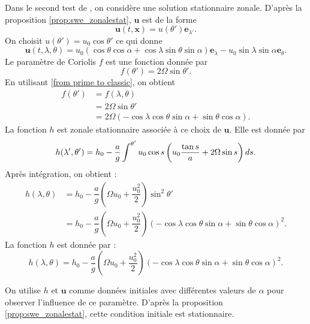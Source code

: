 Dans le second test de \cite{Williamson1992}, on considère une solution stationnaire zonale. D'après la proposition \ref{prop:swe_zonalestat}, $\mathbf{u}$ est de la forme
\begin{equation}
\mathbf{u}(t,\mathbf{x}) = u(\theta')\mathbf{e}_{\lambda'}.
\end{equation}
On choisit $u(\theta') = u_0 \cos \theta'$ ce qui donne
\begin{equation}
\mathbf{u}(t,\lambda, \theta) = u_0 \left( \cos \theta \cos \alpha + \cos \lambda \sin \theta \sin \alpha \right) \mathbf{e}_{\lambda} - u_0 \sin \lambda \sin \alpha \mathbf{e}_{\theta}.
\label{eq: williamson 2 initial velocity}
\end{equation} 
Le paramètre de Coriolis $f$ est une fonction donnée par
\begin{equation}
f(\theta') = 2 \Omega \sin \theta'.
\end{equation}
En utilisant \eqref{from prime to classic}, on obtient
\begin{align*}
f(\theta') & = f (\lambda, \theta)\\
	& = 2 \Omega \sin \theta' \\
	& = 2 \Omega \left( - \cos \lambda \cos \theta \sin \alpha + \sin \theta \cos \alpha \right).
\end{align*}
La fonction $h$ est zonale stationnaire associée à ce choix de $\mathbf{u}$. Elle est donnée par
\begin{equation}
h(\lambda', \theta') = h_0 - \dfrac{a}{g} \displaystyle\int^{\theta'} u_0 \cos s \left( u_0 \dfrac{\tan s}{a} + 2 \Omega \sin s \right) d s.
\end{equation}
Après intégration, on obtient :
\begin{align*}
h(\lambda, \theta) & = h_0 - \dfrac{a}{g} \left( \Omega u_0 + \dfrac{u_0^2}{2} \right) \sin^2 \theta' \\
                   & = h_0 - \dfrac{a}{g} \left( \Omega u_0 + \dfrac{u_0^2}{2} \right) \left( - \cos \lambda \cos \theta \sin \alpha + \sin \theta \cos \alpha \right)^2.
\end{align*}
La fonction $h$ est donnée par :
\begin{equation}
h(\lambda, \theta)= h_0 - \dfrac{a}{g} \left( \Omega u_0 + \dfrac{u_0^2}{2} \right) \left( - \cos \lambda \cos \theta \sin \alpha + \sin \theta \cos \alpha \right)^2.
\label{eq: williamson 2 initial height}
\end{equation}

On utilise $h$ et $\mathbf{u}$ comme données initiales avec différentes valeurs de $\alpha$ pour observer l'influence de ce paramètre. D'après la proposition \ref{prop:swe_zonalestat}, cette condition initiale est stationnaire.

